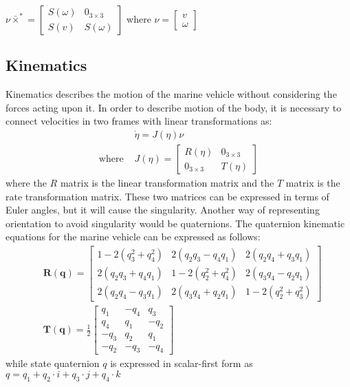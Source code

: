     $
    \nu\bar{\times}^*=\left[\begin{array}{ll}
        S(\omega) & 0_{3 \times 3} \\
        S(v) & S(\omega)
    \end{array}\right]
    $ where $\nu = \left[\begin{array}{l}
        v \\
        \omega
    \end{array}\right]$

\subsection{Kinematics}

    Kinematics describes the motion of the marine vehicle without considering the forces acting upon it.
    In order to describe motion of the body, it is necessary to connect velocities in two frames with linear transformations as:
    $$
    \begin{aligned}
        & \dot{\eta}=J(\eta) \nu \\
        \text{where } & J(\eta)=\left[\begin{array}{cc}
        R(\eta) & 0_{3 \times 3} \\
        0_{3 \times 3} & T(\eta)
        \end{array}\right]
    \end{aligned}
    $$
    where the $R$ matrix is the linear transformation matrix and the $T$ matrix is the rate transformation matrix. 
    These two matrices can be expressed in terms of Euler angles, but it will cause the singularity. 
    Another way of representing orientation to avoid singularity would be quaternions.
    The quaternion kinematic equations for the marine vehicle can be expressed as follows:
    $$
    \begin{aligned}
    & \boldsymbol{R}(\boldsymbol{q})=\left[\begin{array}{ccc}
        1-2\left(q_3^2+q_4^2\right) & 2\left(q_2 q_3-q_4 q_1\right) & 2\left(q_2 q_4+q_3 q_1\right) \\
        2\left(q_2 q_3+q_4 q_1\right) & 1-2\left(q_2^2+q_4^2\right) & 2\left(q_3 q_4-q_2 q_1\right) \\
        2\left(q_2 q_4-q_3 q_1\right) & 2\left(q_3 q_4+q_2 q_1\right) & 1-2\left(q_2^2+q_3^2\right)
        \end{array}\right]\\
    & \boldsymbol{T}(\boldsymbol{q})=\frac{1}{2}\left[\begin{array}{rrr}
        q_1 & -q_4 & q_3 \\
        q_4 & q_1 & -q_2 \\
        -q_3 & q_2 & q_1 \\
        -q_2 & -q_3 & -q_4
        \end{array}\right]
    \end{aligned}
    $$
    while state quaternion $q$ is expressed in scalar-first form as 
    $q = q_1 + q_2\cdot i + q_3\cdot j + q_4\cdot k$

